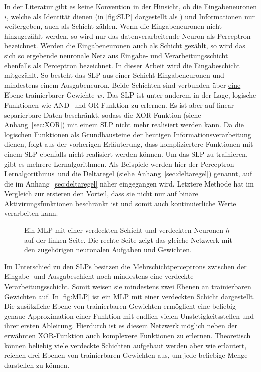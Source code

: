 In der Literatur gibt es keine Konvention in der Hinsicht, ob die Eingabeneuronen $i$, welche als Identität dienen (in \autoref{fig:SLP} dargestellt als ) und Informationen nur weitergeben, auch als Schicht zählen. Wenn die Eingabeneuronen nicht hinzugezählt werden, so wird nur das datenverarbeitende Neuron  als Perceptron bezeichnet. Werden die Eingabeneuronen auch als Schicht gezählt, so wird das sich so ergebende neuronale Netz aus Eingabe- und Verarbeitungsschicht ebenfalls als Perceptron bezeichnet. In dieser Arbeit wird die Eingabeschicht mitgezählt. So besteht das SLP aus einer Schicht Eingabeneuronen und mindestens einem Ausgabeneuron. Beide Schichten sind verbunden über \underline{eine} Ebene trainierbarer Gewichte $\text{\textit{w}}$. Das SLP ist unter anderem in der Lage, logische Funktionen wie AND- und OR-Funktion zu erlernen. Es ist aber auf linear separierbare Daten beschränkt, sodass die XOR-Funktion (siehe Anhang~\ref{sec:XOR}) mit einem SLP nicht mehr realisiert werden kann. Da die logischen Funktionen als Grundbausteine der heutigen Informationsverarbeitung dienen, folgt aus der vorherigen Erläuterung, dass kompliziertere Funktionen mit einem SLP ebenfalls nicht realisiert werden können.
Um das SLP zu trainieren, gibt es mehrere Lernalgorithmen. Als Beispiele werden hier der Perceptron-Lernalgorithmus\, und die Deltaregel (siehe Anhang~\ref{sec:deltaregel}) genannt, auf die im Anhang~\ref{sec:deltaregel} näher eingegangen wird. Letztere Methode hat im Vergleich zur ersteren den Vorteil, dass sie nicht nur auf binäre Aktivirungsfunktionen beschränkt ist und somit auch kontinuierliche Werte verarbeiten kann.\,

\begin{figure}[!htb]
    \centering
        
    \caption[Darstellung eines MLP]{Ein MLP mit einer verdeckten Schicht und verdeckten Neuronen $h$ auf der linken Seite. Die rechte Seite zeigt das gleiche Netzwerk mit den zugehörigen neuronalen Aufgaben und Gewichten.\,\protect\footnotemark{}}
    \label{fig:MLP}
\end{figure}



Im Unterschied zu den SLPs besitzen die Mehrschichtperceptrons zwischen der Eingabe- und Ausgabeschicht noch mindestens eine verdeckte Verarbeitungsschicht. Somit weisen sie \hbox{mindestens} zwei Ebenen an trainierbaren Gewichten auf. In \autoref{fig:MLP} ist ein MLP mit einer verdeckten Schicht dargestellt. Die zusätzliche Ebene von trainierbaren Gewichten ermöglicht eine beliebig genaue Approximation einer Funktion mit endlich vielen Unstetigkeitsstellen und ihrer ersten Ableitung. Hierdurch ist es diesem Netzwerk möglich neben der erwähnten XOR-Funktion auch komplexere Funktionen zu erlernen. Theoretisch können beliebig viele verdeckte Schichten aufgebaut werden aber wie \hbox{\citet{dkriesel07}} erläutert, reichen drei Ebenen von trainierbaren Gewichten aus, um jede beliebige Menge darstellen zu können.\,


